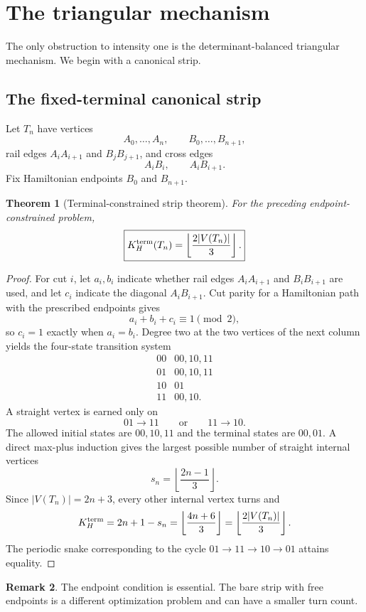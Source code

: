 \documentclass[11pt]{article}
\newtheorem{theorem}{Theorem}[section]
\theoremstyle{definition}
\newtheorem{remark}[theorem]{Remark}
\begin{document}
\section{The triangular mechanism}\label{sec:triangular}
The only obstruction to intensity one is the determinant-balanced triangular mechanism.  We begin with a canonical strip.

\subsection{The fixed-terminal canonical strip}
Let $T_n$ have vertices
\[
A_0,\ldots,A_n,\qquad B_0,\ldots,B_{n+1},
\]
rail edges $A_iA_{i+1}$ and $B_jB_{j+1}$, and cross edges
\[
A_iB_i,\qquad A_iB_{i+1}.
\]
Fix Hamiltonian endpoints $B_0$ and $B_{n+1}$.

\begin{theorem}[Terminal-constrained strip theorem]\label{thm:terminal-strip}
For the preceding endpoint-constrained problem,
\[
\boxed{K_H^{\rm term}(T_n)=\left\lfloor\frac{2|V(T_n)|}{3}\right\rfloor.}
\]
\end{theorem}
\begin{proof}
For cut $i$, let $a_i,b_i$ indicate whether rail edges $A_iA_{i+1}$ and $B_iB_{i+1}$ are used, and let $c_i$ indicate the diagonal $A_iB_{i+1}$.  Cut parity for a Hamiltonian path with the prescribed endpoints gives
\[
a_i+b_i+c_i\equiv1\pmod2,
\]
so $c_i=1$ exactly when $a_i=b_i$.  Degree two at the two vertices of the next column yields the four-state transition system
\[
\begin{array}{c|l}
00&00,10,11\\
01&00,10,11\\
10&01\\
11&00,10.
\end{array}
\]
A straight vertex is earned only on
\[
01\to11\qquad\text{or}\qquad11\to10.
\]
The allowed initial states are $00,10,11$ and the terminal states are $00,01$.  A direct max-plus induction gives the largest possible number of straight internal vertices
\[
s_n=\left\lfloor\frac{2n-1}{3}\right\rfloor.
\]
Since $|V(T_n)|=2n+3$, every other internal vertex turns and
\[
K_H^{\rm term}=2n+1-s_n
=\left\lfloor\frac{4n+6}{3}\right\rfloor
=\left\lfloor\frac{2|V(T_n)|}{3}\right\rfloor.
\]
The periodic snake corresponding to the cycle $01\to11\to10\to01$ attains equality.
\end{proof}

\begin{remark}
The endpoint condition is essential.  The bare strip with free endpoints is a different optimization problem and can have a smaller turn count.
\end{remark}
\end{document}
